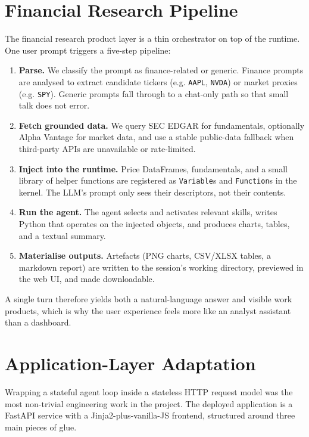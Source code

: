 \documentclass[11pt,a4paper]{article}
\begin{document}
\section{Financial Research Pipeline}

The financial research product layer is a thin orchestrator on top of the runtime. One user prompt triggers a five-step pipeline:

\begin{enumerate}[leftmargin=1.3em,itemsep=0.2em]
    \item \textbf{Parse.} We classify the prompt as finance-related or generic. Finance prompts are analysed to extract candidate tickers (e.g. \texttt{AAPL}, \texttt{NVDA}) or market proxies (e.g. \texttt{SPY}). Generic prompts fall through to a chat-only path so that small talk does not error.
    \item \textbf{Fetch grounded data.} We query SEC EDGAR for fundamentals, optionally Alpha Vantage for market data, and use a stable public-data fallback when third-party APIs are unavailable or rate-limited.
    \item \textbf{Inject into the runtime.} Price DataFrames, fundamentals, and a small library of helper functions are registered as \texttt{Variable}s and \texttt{Function}s in the kernel. The LLM's prompt only sees their descriptors, not their contents.
    \item \textbf{Run the agent.} The agent selects and activates relevant skills, writes Python that operates on the injected objects, and produces charts, tables, and a textual summary.
    \item \textbf{Materialise outputs.} Artefacts (PNG charts, CSV/XLSX tables, a markdown report) are written to the session's working directory, previewed in the web UI, and made downloadable.
\end{enumerate}

A single turn therefore yields both a natural-language answer and visible work products, which is why the user experience feels more like an analyst assistant than a dashboard.

\section{Application-Layer Adaptation}

Wrapping a stateful agent loop inside a stateless HTTP request model was the most non-trivial engineering work in the project. The deployed application is a FastAPI service with a Jinja2-plus-vanilla-JS frontend, structured around three main pieces of glue.
\end{document}
